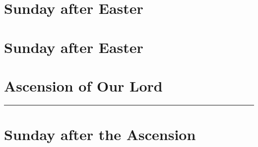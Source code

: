 {{
\section{ Sunday after Easter}
\label{easter4}
\printcommonvespers{}
\def\precollect{\printvrmanenobiscum}
\benedicamusdomino{}
}

{
\section{ Sunday after Easter}
\label{easter5}
\printcommonvespers{}
\def\premagverses{\oldneedspace{12\baselineskip}}
\def\precollect{\printvrmanenobiscum}
\benedicamusdomino{}
}

{
\section{Ascension of Our Lord}
\label{ascension}
\subtitle{ Class, White or Gold}
\vspace{-0.5\baselineskip}
\subtitle{I \& II Vespers}
\vspace{-0.5\baselineskip}

\def\premagnificat{\oldneedspace{7\baselineskip}}
\def\premagverses{\greseteolcustos{manual}}
\def\begincollectcols{%
\begin{parcolumns}[rulebetween,colwidths={1=0.46\linewidth}]{2}}
\def\definevesperspropers{
    \def\prepsalmfive{\greseteolcustos{manual}}
}
\def\definevesperspropersalt{
}
\def\vesperspropersnote{At II Vespers:}
\def\vesperspropersaltnote{At I Vespers:}
\let\printhymnnote=\undefined
\def\hymnlabel{hymn-salutishumanaesator}

\def\commemorations{If today is April 30 or May 1, \emph{First Vespers of St Joseph the Worker} is commemorated as on page \pageref{stjoseph-worker-commem}.}
\printcommemnote[1]{}
\medskip
\hrule
}

{
\section{Sunday after the Ascension}
\label{easter6}\label{sundayafterascension}
\printcommonvespers{}
\renewcommand{\printhymnnote}{
    \medskip
    \noindent\printnote{Hymn.~\emph{Salútis humánæ Sator}, page \pageref{hymn-salutishumanaesator}.}
    \medskip
    \def\vrlinebreak{T}
    \printvr[\greseteolcustos{manual}]{\vrtex}{\vtranslation}{\rtranslation}
}
\def\precollect{\printvrmanenobiscum}
\benedicamusdomino{}
}
}